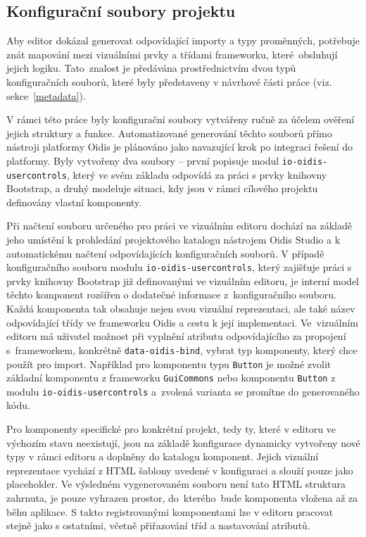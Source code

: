 \subsection{Konfigurační soubory projektu}

Aby editor dokázal generovat odpovídající importy a typy proměnných, potřebuje znát mapování mezi vizuálními prvky a třídami frameworku, které~obsluhují jejich logiku. Tato~znalost je předávána prostřednictvím dvou typů konfiguračních souborů, které byly představeny v návrhové části práce (viz. sekce~\ref{metadata}).

V rámci této práce byly konfigurační soubory vytvářeny ručně za účelem ověření jejich struktury a funkce. Automatizované generování těchto souborů přímo nástroji platformy Oidis je plánováno jako navazující krok po integraci řešení do platformy. Byly vytvořeny dva soubory -- první popisuje modul \texttt{io-oidis-usercontrols}, který ve svém základu odpovídá za práci s prvky knihovny Bootstrap, a druhý modeluje situaci, kdy jsou v rámci cílového projektu definovány vlastní komponenty.

Při načtení souboru určeného pro práci ve vizuálním editoru dochází na základě jeho umístění k prohledání projektového katalogu nástrojem Oidis Studio a k automatickému načtení odpovídajících konfiguračních souborů. V případě konfiguračního souboru modulu \texttt{io-oidis-usercontrols}, který zajišťuje práci s prvky knihovny Bootstrap již definovanými ve vizuálním editoru, je interní model těchto komponent rozšířen o dodatečné informace z~konfiguračního souboru. Každá komponenta tak obsahuje nejen svou vizuální reprezentaci, ale také název odpovídající třídy ve frameworku Oidis a cestu k její implementaci. Ve~vizuálním editoru má uživatel možnost při vyplnění atributu odpovídajícího za propojení s~frameworkem, konkrétně \texttt{data-oidis-bind}, vybrat typ komponenty, který chce použít pro import. Například pro komponentu typu \texttt{Button} je možné zvolit základní komponentu z frameworku \texttt{GuiCommons} nebo komponentu \texttt{Button} z modulu \texttt{io-oidis-usercontrols} a~zvolená varianta se promítne do generovaného kódu.

Pro komponenty specifické pro konkrétní projekt, tedy ty, které v editoru ve výchozím stavu neexistují, jsou na základě konfigurace dynamicky vytvořeny nové typy v rámci editoru a doplněny do katalogu komponent. Jejich vizuální reprezentace vychází z HTML šablony uvedené v konfiguraci a slouží pouze jako placeholder. Ve výsledném vygenerovaném souboru není tato HTML struktura 
zahrnuta, je pouze vyhrazen prostor, do~kterého~bude komponenta vložena až za běhu aplikace. S takto registrovanými komponentami lze v editoru pracovat stejně jako s ostatními, včetně přiřazování tříd a nastavování atributů.

